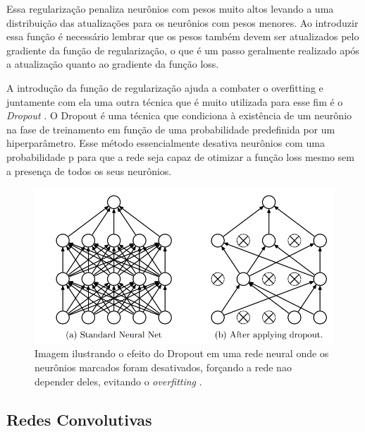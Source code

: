 Essa regularização penaliza neurônios com pesos muito altos levando a uma distribuição das atualizações para os neurônios com pesos menores. Ao introduzir essa função é necessário lembrar que os pesos também devem ser atualizados pelo gradiente da função de regularização, o que é um passo geralmente realizado após a atualização quanto ao gradiente da função loss.

A introdução da função de regularização ajuda a combater o overfitting e juntamente com ela uma outra técnica que é muito utilizada para esse fim é o \textit{Dropout} \cite{dropout2014}. O Dropout é uma técnica que condiciona à existência de um neurônio na fase de treinamento em função de uma probabilidade predefinida por um hiperparâmetro. Esse método essencialmente desativa neurônios com uma probabilidade p para que a rede seja capaz de otimizar a função loss mesmo sem a presença de todos os seus neurônios.

\begin{figure}[h]
	\centering
	\includegraphics[scale=0.4]{pasta1_figuras/dropout.png}
	\caption{Imagem ilustrando o efeito do Dropout em uma rede neural onde os neurônios marcados foram desativados, forçando a rede nao depender deles, evitando o \textit{overfitting} \cite{dropout2014}.}
	
	\label{fig-dropout}
\end{figure}

\subsection{Redes Convolutivas} \label{cnn}

